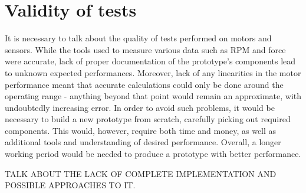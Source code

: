 \section{Validity of tests}
It is necessary to talk about the quality of tests performed on motors and sensors. While the tools used to measure various data such as RPM and force were accurate, lack of proper documentation of the prototype's components lead to unknown expected performances. Moreover, lack of any linearities in the motor performance meant that accurate calculations could only be done around the operating range - anything beyond that point would remain an approximate, with undoubtedly increasing error.
In order to avoid such problems, it would be necessary to build a new prototype from scratch, carefully picking out required components. This would, however, require both time and money, as well as additional tools and understanding of desired performance. Overall, a longer working period would be needed to produce a prototype with better performance.

TALK ABOUT THE LACK OF COMPLETE IMPLEMENTATION AND POSSIBLE APPROACHES TO IT.